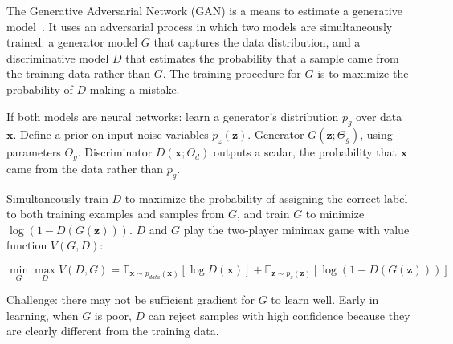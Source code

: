 The Generative Adversarial Network (GAN) is a means to estimate a generative model~\cite{Goodfellow2014}. It uses an adversarial process in which two models are simultaneously trained: a generator model $G$ that captures the data distribution, and a discriminative model $D$ that estimates the probability that a sample came from the training data rather than $G$. The training procedure for $G$ is to maximize the probability of $D$ making a mistake.

If both models are neural networks: learn a generator's distribution $p_g$ over data $\bm{x}$. Define a prior on input noise variables $p_z(\bm{z})$. Generator $G(\bm{z}; \Theta_g)$, using parameters $\Theta_g$. Discriminator $D(\bm{x}; \Theta_d)$ outputs a scalar, the probability that $\bm{x}$ came from the data rather than $p_g$. 

Simultaneously train $D$ to maximize the probability of assigning the correct label to both training examples and samples from $G$, and train $G$ to minimize $\log (1 - D(G(\bm{z})))$. $D$ and $G$ play the two-player minimax game with value function $V(G, D)$:

\[ \min_G \max_D V(D, G) = \mathbb{E}_{\bm{x} \sim  p_{data}(\bm{x})} [ \log D(\bm{x}) ] + \mathbb{E}_{\bm{z} \sim p_z(\bm{z})} [ \log (1 - D(G(\bm{z}))) ] \]

Challenge: there may not be sufficient gradient for $G$ to learn well. Early in learning, when $G$ is poor, $D$ can reject samples with high confidence because they are clearly different from the training data.